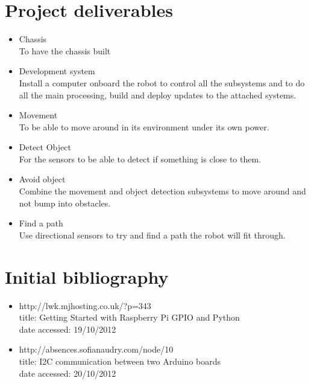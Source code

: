 \documentclass[11pt,fleqn,twoside]{article}
\begin{document}

\section{Project deliverables}
\begin{itemize}
\item Chassis
\\To have the chassis built
\item Development system
\\Install a computer onboard the robot to control all the subsystems and to do all the main processing, build and deploy updates to the attached systems.
\item Movement
\\To be able to move around in its environment under its own power.
\item Detect Object
\\For the sensors to be able to detect if something is close to them.
\item Avoid object
\\Combine the movement and object detection subsystems to move around and not bump into obstacles.
\item Find a path
\\Use directional sensors to try and find a path the robot will fit through.
\end{itemize}

\section{Initial bibliography}

\begin{itemize}
\item http://lwk.mjhosting.co.uk/?p=343
\\title: Getting Started with Raspberry Pi GPIO and Python
\\date accessed: 19/10/2012

\item http://absences.sofianaudry.com/node/10
\\title: I2C communication between two Arduino boards
\\date accessed: 20/10/2012
\end{itemize}




\renewcommand{\refname}{}  %
\end{document}
